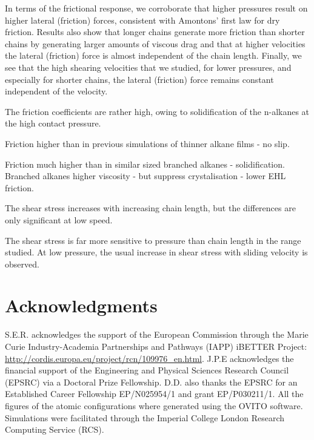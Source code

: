 \documentclass[aps,prb,reprint,superscriptaddress, a4paper]{revtex4-1}
\begin{document}
In terms of the frictional response, we corroborate that higher pressures result on higher lateral (friction) forces, consistent with Amontons' first law for dry friction. Results also show that longer chains generate more friction than shorter chains by  generating larger amounts of viscous drag and that at higher velocities the  lateral (friction) force is almost independent of the chain length. Finally, we see that the high shearing velocities that we studied, for lower pressures, and especially for shorter chains, the lateral (friction) force remains constant independent of the velocity.

The friction coefficients are rather high, owing to solidification of the n-alkanes at the high contact pressure.

Friction higher than in previous simulations of thinner alkane films - no slip.

Friction much higher than in similar sized branched alkanes - solidification. Branched alkanes higher viscosity - but suppress crystalisation - lower EHL friction.

The shear stress increases with increasing chain length, but the differences are only significant at low speed.

The shear stress is far more sensitive to pressure than chain length in the range studied. At low pressure, the usual increase in shear stress with sliding velocity is observed. 

\section*{Acknowledgments}

S.E.R. acknowledges the support of the European Commission through the Marie Curie Industry-Academia Partnerships and Pathways (IAPP) iBETTER Project: \url{http://cordis.europa.eu/project/rcn/109976_en.html}. J.P.E acknowledges the financial support of the Engineering and Physical Sciences Research Council (EPSRC) via a Doctoral Prize Fellowship. D.D. also thanks the EPSRC for an Established Career Fellowship EP/N025954/1 and grant EP/P030211/1. All the figures of the atomic configurations where generated using the OVITO\cite{Stukowski2010b} software. Simulations were facilitated through the Imperial College London Research Computing Service (RCS).

\end{document}
